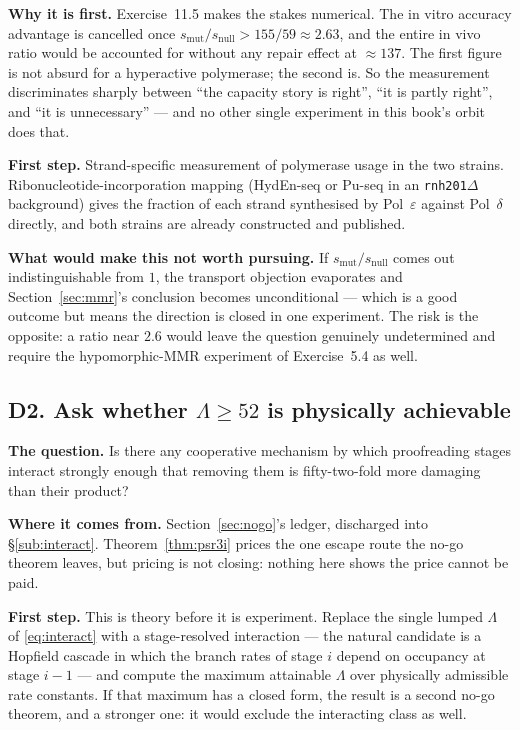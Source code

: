 \textbf{Why it is first.} Exercise~11.5 makes the stakes numerical. The in vitro
accuracy advantage is cancelled once $s_{\mathrm{mut}}/s_{\mathrm{null}} > 155/59
\approx 2.63$, and the entire in vivo ratio would be accounted for without any
repair effect at $\approx 137$. The first figure is not absurd for a hyperactive
polymerase; the second is. So the measurement discriminates sharply between
``the capacity story is right'', ``it is partly right'', and ``it is unnecessary''
--- and no other single experiment in this book's orbit does that.

\textbf{First step.} Strand-specific measurement of polymerase usage in the two
strains. Ribonucleotide-incorporation mapping (HydEn-seq or Pu-seq in an
\texttt{rnh201}$\Delta$ background) gives the fraction of each strand synthesised
by Pol~$\varepsilon$ against Pol~$\delta$ directly, and both strains are already
constructed and published.

\textbf{What would make this not worth pursuing.} If $s_{\mathrm{mut}} /
s_{\mathrm{null}}$ comes out indistinguishable from $1$, the transport objection
evaporates and Section~\ref{sec:mmr}'s conclusion becomes unconditional ---
which is a good outcome but means the direction is closed in one experiment. The
risk is the opposite: a ratio near $2.6$ would leave the question genuinely
undetermined and require the hypomorphic-MMR experiment of Exercise~5.4 as well.

\subsection*{D2. Ask whether $\Lambda \ge 52$ is physically achievable}

\textbf{The question.} Is there any cooperative mechanism by which proofreading
stages interact strongly enough that removing them is fifty-two-fold more
damaging than their product?

\textbf{Where it comes from.} Section~\ref{sec:nogo}'s ledger, discharged into
\S\ref{sub:interact}. Theorem~\ref{thm:psr3i} prices the one escape route the
no-go theorem leaves, but pricing is not closing: nothing here shows the price
cannot be paid.

\textbf{First step.} This is theory before it is experiment. Replace the single
lumped $\Lambda$ of \eqref{eq:interact} with a stage-resolved interaction ---
the natural candidate is a Hopfield cascade in which the branch rates of stage
$i$ depend on occupancy at stage $i-1$ --- and compute the maximum attainable
$\Lambda$ over physically admissible rate constants. If that maximum has a
closed form, the result is a second no-go theorem, and a stronger one: it would
exclude the interacting class as well.

